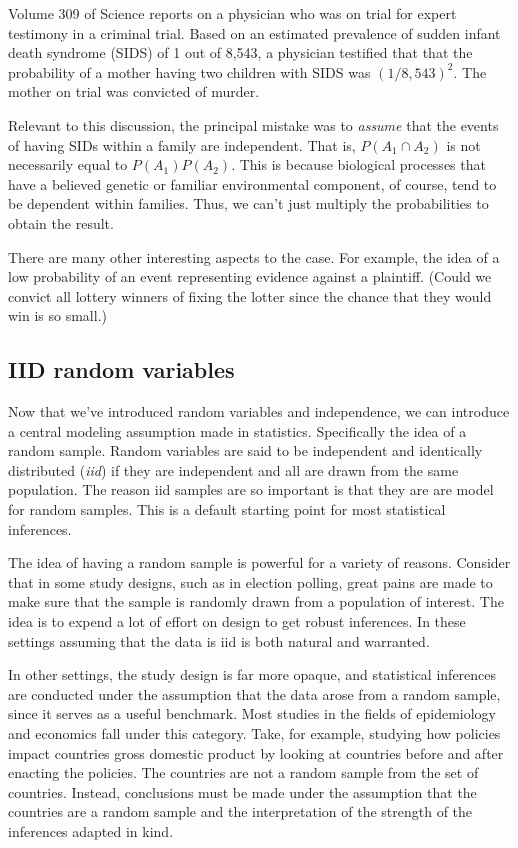 \documentclass[]{article}
\begin{document}
Volume 309 of Science reports on a physician who was on trial for expert
testimony in a criminal trial. Based on an estimated prevalence of
sudden infant death syndrome (SIDS) of 1 out of 8,543, a physician
testified that that the probability of a mother having two children with
SIDS was $(1 / 8,543)^2$. The mother on trial was convicted of murder.

Relevant to this discussion, the principal mistake was to \emph{assume}
that the events of having SIDs within a family are independent. That is,
$P(A_1 \cap A_2)$ is not necessarily equal to $P(A_1)P(A_2)$. This is
because biological processes that have a believed genetic or familiar
environmental component, of course, tend to be dependent within
families. Thus, we can't just multiply the probabilities to obtain the
result.

There are many other interesting aspects to the case. For example, the
idea of a low probability of an event representing evidence against a
plaintiff. (Could we convict all lottery winners of fixing the lotter
since the chance that they would win is so small.)

\subsection{IID random variables}\label{iid-random-variables}

Now that we've introduced random variables and independence, we can
introduce a central modeling assumption made in statistics. Specifically
the idea of a random sample. Random variables are said to be independent
and identically distributed (\emph{iid}) if they are independent and all
are drawn from the same population. The reason iid samples are so
important is that they are are model for random samples. This is a
default starting point for most statistical inferences.

The idea of having a random sample is powerful for a variety of reasons.
Consider that in some study designs, such as in election polling, great
pains are made to make sure that the sample is randomly drawn from a
population of interest. The idea is to expend a lot of effort on design
to get robust inferences. In these settings assuming that the data is
iid is both natural and warranted.

In other settings, the study design is far more opaque, and statistical
inferences are conducted under the assumption that the data arose from a
random sample, since it serves as a useful benchmark. Most studies in
the fields of epidemiology and economics fall under this category. Take,
for example, studying how policies impact countries gross domestic
product by looking at countries before and after enacting the policies.
The countries are not a random sample from the set of countries.
Instead, conclusions must be made under the assumption that the
countries are a random sample and the interpretation of the strength of
the inferences adapted in kind.
\end{document}
